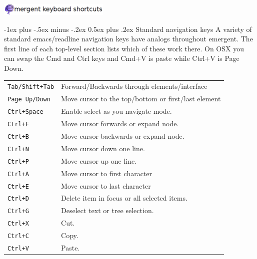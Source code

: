 \documentclass[10pt,landscape]{article}
\makeatletter
\renewcommand{\section}{\@startsection{section}{1}{0mm}%
                                {-1ex plus -.5ex minus -.2ex}%
                                {0.5ex plus .2ex}%
                                {\normalfont\large\bfseries}}
\makeatother
\begin{document}
\raggedright
\footnotesize
\begin{multicols}{3}

\setlength{\premulticols}{1pt}
\setlength{\postmulticols}{1pt}
\setlength{\multicolsep}{1pt}
\setlength{\columnsep}{2pt}

\begin{center}\includegraphics[width=198.5px]{header.png}\end{center}

\section{Standard navigation keys}
A variety of standard emacs/readline navigation keys have analogs
throughout emergent. The first line of each top-level section lists
which of these work there. On OSX you can swap the Cmd and Ctrl keys
and Cmd+V is paste while Ctrl+V is Page Down. \\
\begin{tabular}{@{}ll@{}}
\\
\verb!Tab/Shift+Tab! & Forward/Backwards through elements/interface \\
\verb!Page Up/Down!    & Move cursor to the top/bottom or first/last element\\
\verb!Ctrl+Space!    & Enable select as you navigate mode. \\
\verb!Ctrl+F!    & Move cursor forwards or expand node. \\
\verb!Ctrl+B!    & Move cursor backwards or expand node. \\
\verb!Ctrl+N!    & Move cursor down one line. \\
\verb!Ctrl+P!    & Move cursor up one line. \\
\verb!Ctrl+A!    & Move cursor to first character \\
\verb!Ctrl+E!    & Move cursor to last character \\
\verb!Ctrl+D!  & Delete item in focus or all selected items. \\
\verb!Ctrl+G!  & Deselect text or tree selection. \\
\verb!Ctrl+X! & Cut. \\
\verb!Ctrl+C! & Copy. \\
\verb!Ctrl+V! & Paste.
\end{tabular}


\end{multicols}
\end{document}
